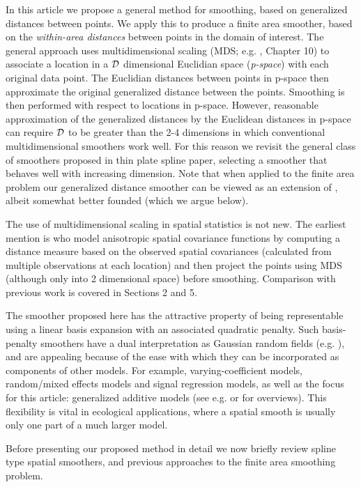 \documentclass[smallextended]{svjour3}       %
\begin{document}
In this article we propose a general method for smoothing, based on generalized distances between points. We apply this to produce a finite area smoother, based on the \textit{within-area distances} between points in the domain of interest. The general approach uses multidimensional scaling (MDS; e.g. \cite{chatfield1980introduction}, Chapter 10) to associate a location in a $\cal D$ dimensional Euclidian space ({\em p-space}) with each original data point. The Euclidian distances between points in p-space then approximate the original generalized distance between the points. Smoothing is then performed with respect to locations in p-space. However, reasonable approximation of the generalized distances by the Euclidean distances in p-space can require $\cal D$ to be greater than the 2-4 dimensions in which conventional multidimensional smoothers work well. For this reason we revisit the general class of smoothers proposed in \cite{Duchon:1977tr} thin plate spline paper, selecting a smoother that behaves well with increasing dimension. Note that when applied to the finite area problem our generalized distance smoother can be viewed as an  extension of \cite{Wang:2007tf}, albeit somewhat better founded (which we argue below).

The use of multidimensional scaling in spatial statistics is not new. The earliest mention is \cite{Sampson:1992wm} who model anisotropic spatial covariance functions by computing a distance measure based on the observed spatial covariances (calculated from multiple observations at each location) and then project the points using MDS (although only into 2 dimensional space) before smoothing. Comparison with previous work is covered in Sections 2 and 5.

The smoother proposed here has the attractive property of being representable using a linear basis expansion with an associated quadratic penalty. Such basis-penalty smoothers have a dual interpretation as Gaussian random fields (e.g. \cite{rue2005gaussian}), and are appealing because of the ease with which they can be incorporated as components of other models. For example, varying-coefficient models, random/mixed effects models and signal regression models, as well as the focus for this article: generalized additive models (see e.g. \cite{ruppert2003semiparametric} or \cite{Wood:2006wz} for overviews). This flexibility is vital in ecological applications, where a spatial smooth is usually only one part of a much larger model.

Before presenting our proposed method in detail we now briefly review spline type spatial smoothers, and previous approaches to the finite area smoothing problem.
\end{document}
